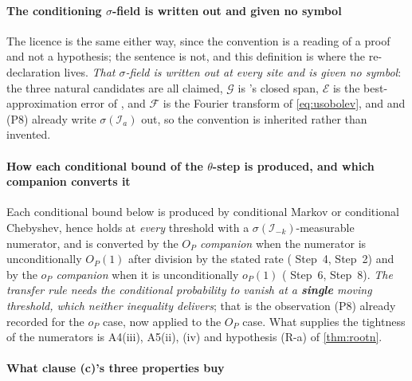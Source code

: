 \paragraph{The conditioning $\sigma$-field is written out and given no symbol}

The licence is the same
either way, since the convention is a reading of a proof and not a hypothesis; the sentence is not, and this
definition is where the re-declaration lives. \emph{That $\sigma$-field is written out at every site and is
given no symbol}: the
three natural candidates are all claimed, $\mathcal G$ is 's closed span,
$\mathcal E$ is the best-approximation error of , and $\mathcal F$ is the Fourier
transform of \eqref{eq:usobolev}, and  and \textup{(P8)} already write
$\sigma(\mathcal I_a)$ out, so the convention is inherited rather than invented.

\paragraph{How each conditional bound of the $\theta$-step is produced, and which companion converts it}

Each conditional bound below is produced by conditional Markov or conditional Chebyshev, hence holds at
\emph{every} threshold with a $\sigma(\mathcal I_{-k})$-measurable numerator, and is converted by the
\emph{$O_P$ companion} when the numerator is unconditionally $O_P(1)$ after division by the stated rate
( Step~4,  Step~2) and by the \emph{$o_P$ companion} when it is
unconditionally $o_P(1)$ ( Step~6,  Step~8). \emph{The transfer rule
needs the conditional probability to vanish at a \textbf{single} moving threshold, which neither
inequality delivers}; that is the observation \textup{(P8)} already recorded for the $o_P$ case, now
applied to the $O_P$ case. What supplies the tightness of the numerators is A4(iii), A5(ii), (iv) and
hypothesis (R-a) of \cref{thm:rootn}.

\paragraph{What clause \textup{(c)}'s three properties buy}

